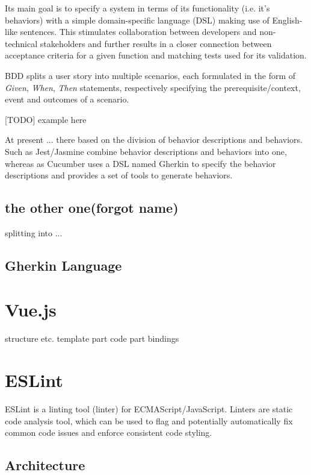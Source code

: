 Its main goal is to specify a system in terms of its functionality (i.e. it's behaviors) with a simple domain-specific language (DSL) making use of English-like sentences. This stimulates collaboration between developers and non-technical stakeholders and further results in a closer connection between acceptance criteria for a given function and matching tests used for its validation.

BDD splits a user story into multiple scenarios, each formulated in the form of \textit{Given}, \textit{When}, \textit{Then} statements, respectively specifying the prerequisite/context, event and outcomes of a scenario. 

[TODO] example here

At present ... there based on the division of behavior descriptions and behaviors. Such as Jest/Jasmine combine behavior descriptions and behaviors into one, whereas as Cucumber uses a DSL named Gherkin to specify the behavior descriptions and provides a set of tools to generate behaviors.


 \subsection{the other one(forgot name)}
 splitting into ...
\subsection{Gherkin Language}
\section{Vue.js}
structure etc.
template part
code part
bindings


\section{ESLint}

ESLint \parencite{eslintMainPage} is a linting tool (linter) for ECMAScript/JavaScript. Linters are static code analysis tool, which can be used to flag and potentially automatically fix common code issues and enforce consistent code styling.


\subsection{Architecture}

